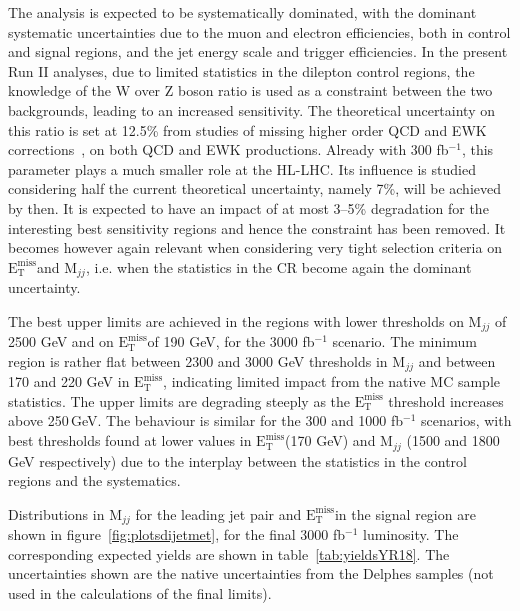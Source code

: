 \documentclass[../report.tex]{subfiles}
\newcommand{\MET}{\ensuremath{\mathrm{E}_{\mathrm{T}}^{\mathrm{miss}}}}
\begin{document}
The analysis is expected to be systematically dominated, with the
dominant systematic uncertainties due to the muon and electron
efficiencies, both in control and signal regions, and the jet energy
scale and trigger efficiencies. In the present Run II analyses, due to
limited statistics in the dilepton control regions, the knowledge of
the W over Z boson ratio is used as a constraint between the two
backgrounds, leading to an increased sensitivity. The theoretical
uncertainty on this ratio is set at 12.5\% from studies of missing
higher order QCD and EWK corrections~\cite{Sirunyan:2018owy}, on both
QCD and EWK productions. Already with 300 fb$^{-1}$, this parameter
plays a much smaller role at the HL-LHC. Its influence is studied
considering half the current theoretical uncertainty, namely 7\%, will
be achieved by then. It is expected to have an impact of at most
3--5\% degradation for the interesting best sensitivity regions and
hence the constraint has been removed. It becomes however again
relevant when considering very tight selection criteria on \MET and
M$_{jj}$, i.e. when the statistics in the CR become again the dominant
uncertainty.

The best upper limits are achieved in the regions with lower
thresholds on M$_{jj}$ of 2500 GeV and on \MET of 190 GeV, for the
3000 fb$^{-1}$ scenario. The minimum region is rather flat between
2300 and 3000 GeV thresholds in M$_{jj}$ and between 170 and 220 GeV
in \MET, indicating limited impact from the native MC sample
statistics. The upper limits are degrading steeply as the \MET
threshold increases above 250\,GeV. The behaviour is similar for the
300 and 1000 fb$^{-1}$ scenarios, with best thresholds found at lower
values in \MET (170 GeV) and M$_{jj}$ (1500 and 1800 GeV respectively)
due to the interplay between the statistics in the control regions and
the systematics.

Distributions in M$_{jj}$ for
the leading jet pair and \MET in the signal region are shown in
figure~\ref{fig:plotsdijetmet}, for the final 3000 fb$^{-1}$ luminosity. The
corresponding expected yields are shown in
table~\ref{tab:yieldsYR18}. The uncertainties shown are the native
uncertainties from the Delphes samples (not used in the calculations
of the final limits).
\end{document}
